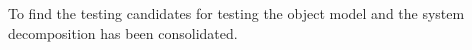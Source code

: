 To find the testing candidates for testing the object model and the system decomposition has been consolidated.
\subsection{}
